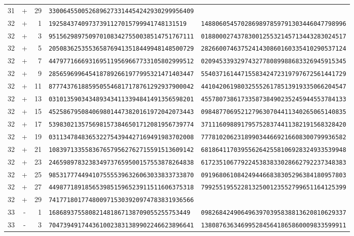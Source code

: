 \begin{longtable}{@{}rcrll@{}}
31&+&29&\texttt{3300645500526896273314454242930299956409}&\texttt{}\\
32&+&1&\texttt{19258437409737391127015799941748131519}&\texttt{1488060545702869897859791303446047798996}\\
32&+&3&\texttt{9515629897509701083427550038514751767111}&\texttt{0188000274378300125532145713443283024517}\\
32&+&5&\texttt{2050836253553658769413518449948148500729}&\texttt{2826600746375241430860160335410290537124}\\
32&+&7&\texttt{4479771666931695119569667733105802999512}&\texttt{0209453393297432778089988683326945915345}\\
32&+&9&\texttt{2856596996454187892661977995321471403447}&\texttt{5540371614471558342472319797672561441729}\\
32&+&11&\texttt{8777437618859505546817178761292937900042}&\texttt{4410420619803255526178513919335066204547}\\
32&+&13&\texttt{0310135903434893434113394841491356598201}&\texttt{4557807386173358738490235245944553784133}\\
32&+&15&\texttt{4525867950840698014473820161972042073443}&\texttt{0984877069521279630704411340265065140835}\\
32&+&17&\texttt{5398302135756981573846501712081956739774}&\texttt{3711160988917957528374411382191568328420}\\
32&+&19&\texttt{0311347848365322754394427169491983702008}&\texttt{7778102062318990344669216608300799936582}\\
32&+&21&\texttt{1083971335583676579562762715591513609142}&\texttt{6818641170395562642558106928324933539948}\\
32&+&23&\texttt{2465989783238349737659500157553878264838}&\texttt{6172351067792245383833028662792237348383}\\
32&+&25&\texttt{9853177744941075555396326063033833733870}&\texttt{0919680610842494466838305296384180957803}\\
32&+&27&\texttt{4498771891856539851596523911511606375318}&\texttt{7992551955228132500123552799651164125399}\\
32&+&29&\texttt{7417718017748009715303920974783831936566}&\texttt{}\\
33&-&1&\texttt{168689375580821481867138709055255753449}&\texttt{0982684249064963970395838813620810629337}\\
33&-&3&\texttt{7047394917443610023831389902246623896641}&\texttt{1380876363469952845641865860009833599911}\\

\end{longtable}
